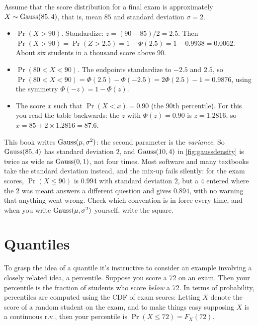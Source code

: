 \begin{worked}
Assume that the score distribution for a final exam is approximately $X \sim \text{Gauss}(85, 4)$, that is, mean $85$ and standard deviation $\sigma = 2$.
\begin{itemize}[nosep]
\item $\Pr(X > 90)$. Standardize: $z = (90 - 85)/2 = 2.5$. Then $\Pr(X > 90) = \Pr(Z > 2.5) = 1 - \Phi(2.5) = 1 - 0.9938 = 0.0062$. About six students in a thousand score above $90$.
\item $\Pr(80 < X < 90)$. The endpoints standardize to $-2.5$ and $2.5$, so $\Pr(80 < X < 90) = \Phi(2.5) - \Phi(-2.5) = 2\Phi(2.5) - 1 = 0.9876$, using the symmetry $\Phi(-z) = 1 - \Phi(z)$.
\item The score $x$ such that $\Pr(X < x) = 0.90$ (the $90$th percentile). For this you read the table backwards: the $z$ with $\Phi(z) = 0.90$ is $z = 1.2816$, so $x = 85 + 2 \times 1.2816 = 87.6$.
\end{itemize}
\end{worked}

\begin{pitfall}
This book writes $\text{Gauss}(\mu, \sigma^2)$: the second parameter is the \textit{variance}.
So $\text{Gauss}(85, 4)$ has standard deviation $2$, and $\text{Gauss}(10, 4)$ in \cref{fig:gaussdensity} is twice as wide as $\text{Gauss}(0, 1)$, not four times.
Most software and many textbooks take the standard deviation instead, and the mix-up fails silently: for the exam scores, $\Pr(X \leq 90)$ is $0.994$ with standard deviation $2$, but a $4$ entered where the $2$ was meant answers a different question and gives $0.894$, with no warning that anything went wrong.
Check which convention is in force every time, and when you write $\text{Gauss}(\mu, \sigma^2)$ yourself, write the square.
\end{pitfall}

\section{Quantiles}
\label{sec:gauss-quantiles}

To grasp the idea of a quantile it's instructive to consider an example involving a closely related idea, a percentile.
Suppose you score a 72 on an exam.
Then your percentile is the fraction of students who score \textit{below} a 72.
In terms of probability, percentiles are computed using the CDF of exam scores: Letting $X$ denote the score of a random student on the exam, and to make things easy supposing $X$ is a continuous r.v., then your percentile is $\Pr(X \leq 72) = F_X(72)$.

